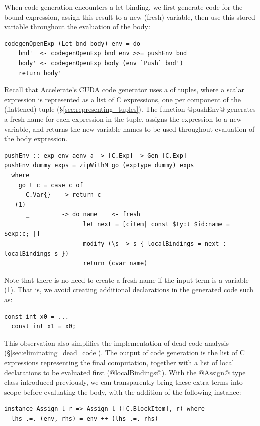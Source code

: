 When code generation encounters a let binding, we first generate code for the
bound expression, assign this result to a new (fresh) variable, then use this
stored variable throughout the evaluation of the body:
%
\begin{lstlisting}[style=haskell]
codegenOpenExp (Let bnd body) env = do
    bnd'  <- codegenOpenExp bnd env >>= pushEnv bnd
    body' <- codegenOpenExp body (env `Push` bnd')
    return body'
\end{lstlisting}

Recall that Accelerate's CUDA code generator uses a  of tuples, where a scalar expression is represented as a list of
C expressions, one per component of the (flattened) tuple
(\S\ref{sec:representing_tuples}). The function @pushEnv@ generates a fresh name
for each expression in the tuple, assigns the expression to a new variable, and
returns the new variable names to be used throughout evaluation of the body
expression.
%
\begin{lstlisting}[style=haskell]
pushEnv :: exp env aenv a -> [C.Exp] -> Gen [C.Exp]
pushEnv dummy exps = zipWithM go (expType dummy) exps
  where
    go t c = case c of
      C.Var{}   -> return c                                                        -- (1)
      _         -> do name    <- fresh
                      let next = [citem| const $ty:t $id:name = $exp:c; |]
                      modify (\s -> s { localBindings = next : localBindings s })
                      return (cvar name)
\end{lstlisting}
%
Note that there is no need to create a fresh name if the input term is a
variable (1). That is, we avoid creating additional declarations in the
generated code such as:
%
\begin{lstlisting}[language=cuda]
  const int x0 = ...
  const int x1 = x0;
\end{lstlisting}
%
This observation also simplifies the implementation of dead-code analysis
(\S\ref{sec:eliminating_dead_code}). The output of code generation is the list
of C expressions representing the final computation, together with a list of
local declarations to be evaluated first (@localBindings@). With the @Assign@
type class introduced previously, we can transparently bring these extra terms
into scope before evaluating the body, with the addition of the following
instance:
%
\begin{lstlisting}[style=haskell]
instance Assign l r => Assign l ([C.BlockItem], r) where
  lhs .=. (env, rhs) = env ++ (lhs .=. rhs)
\end{lstlisting}



